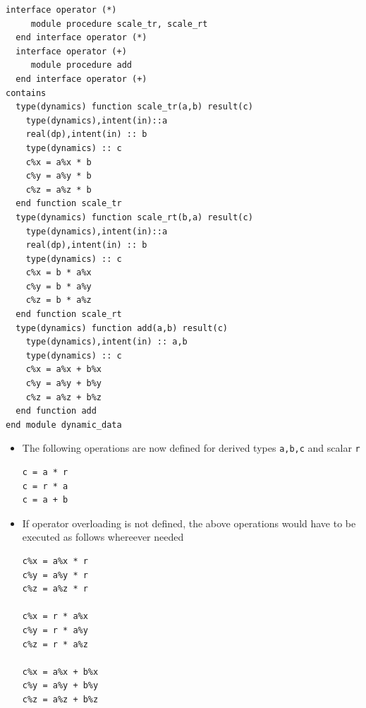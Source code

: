 \documentclass[c,mathserif,compress,xcolor=svgnames]{beamer}
\newcommand{\lstfortran}[1]{\lstinline[language={[90]Fortran},basicstyle=\footnotesize\ttfamily]|#1|}
\begin{document}
\begin{frame}
\begin{lstlisting}[language={[90]Fortran},basicstyle=\fontsize{5}{6}\selectfont\ttfamily,multicols=2]
  interface operator (*)
     module procedure scale_tr, scale_rt
  end interface operator (*)
  interface operator (+)
     module procedure add
  end interface operator (+)
contains
  type(dynamics) function scale_tr(a,b) result(c)
    type(dynamics),intent(in)::a
    real(dp),intent(in) :: b
    type(dynamics) :: c
    c%x = a%x * b
    c%y = a%y * b
    c%z = a%z * b
  end function scale_tr
  type(dynamics) function scale_rt(b,a) result(c)
    type(dynamics),intent(in)::a
    real(dp),intent(in) :: b
    type(dynamics) :: c
    c%x = b * a%x
    c%y = b * a%y
    c%z = b * a%z
  end function scale_rt
  type(dynamics) function add(a,b) result(c)
    type(dynamics),intent(in) :: a,b
    type(dynamics) :: c
    c%x = a%x + b%x
    c%y = a%y + b%y
    c%z = a%z + b%z
  end function add
end module dynamic_data
  \end{lstlisting}
  \begin{itemize}
    \item The following operations are now defined for derived types \lstfortran{a,b,c} and scalar \lstfortran{r}
      \begin{lstlisting}[language={[90]Fortran},basicstyle=\fontsize{7}{8}\selectfont\ttfamily]
c = a * r
c = r * a
c = a + b
      \end{lstlisting}
    \item If operator overloading is not defined, the above operations would have to be executed as follows whereever needed
      \begin{lstlisting}[language={[90]Fortran},basicstyle=\fontsize{7}{8}\selectfont\ttfamily]
c%x = a%x * r
c%y = a%y * r
c%z = a%z * r

c%x = r * a%x
c%y = r * a%y
c%z = r * a%z

c%x = a%x + b%x
c%y = a%y + b%y
c%z = a%z + b%z 
      \end{lstlisting}
  \end{itemize}
\end{frame}
\end{document}
